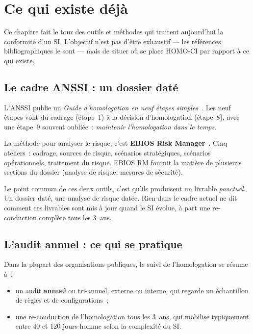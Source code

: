 \chapter{Ce qui existe déjà}
\label{ch:etat-existant}

Ce chapitre fait le tour des outils et méthodes qui traitent
aujourd'hui la conformité d'un SI. L'objectif n'est pas d'être
exhaustif --- les références bibliographiques le sont --- mais de
situer où se place HOMO-CI par rapport à ce qui existe.

\section{Le cadre ANSSI : un dossier daté}

L'ANSSI publie un \emph{Guide d'homologation en neuf étapes
simples}~\cite{anssi-homologation-2014}. Les neuf étapes vont du
cadrage (étape~1) à la décision d'homologation (étape~8), avec
une étape~9 souvent oubliée~: \emph{maintenir l'homologation dans
le temps}.

La méthode pour analyser le risque, c'est \textbf{EBIOS Risk
Manager}~\cite{anssi-ebios-rm-2018}. Cinq ateliers~: cadrage,
sources de risque, scénarios stratégiques, scénarios
opérationnels, traitement du risque. EBIOS RM fournit la matière
de plusieurs sections du dossier (analyse de risque, mesures de
sécurité).

Le point commun de ces deux outils, c'est qu'ils produisent un
livrable \emph{ponctuel}. Un dossier daté, une analyse de risque
datée. Rien dans le cadre actuel ne dit comment ces livrables
sont mis à jour quand le SI évolue, à part une re-conduction
complète tous les 3~ans.

\section{L'audit annuel : ce qui se pratique}

Dans la plupart des organisations publiques, le suivi de
l'homologation se résume à~:

\begin{itemize}
  \item un audit \textbf{annuel} ou tri-annuel, externe ou
    interne, qui regarde un échantillon de règles et de
    configurations~;
  \item une re-conduction de l'homologation tous les 3~ans, qui
    mobilise typiquement entre 40 et 120 jours-homme selon la
    complexité du SI.
\end{itemize}

